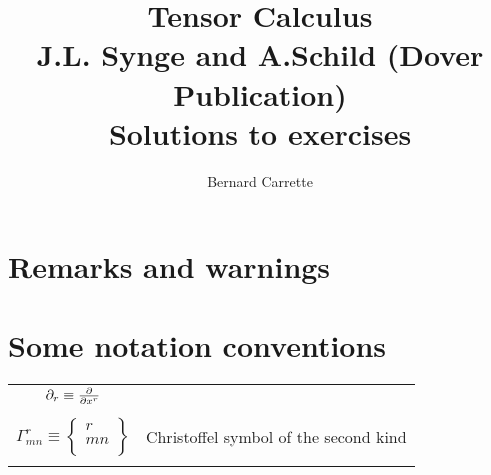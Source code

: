 \documentclass{ut-thesis}
\author{Bernard Carrette}
\title{Tensor Calculus\\J.L. Synge and A.Schild (Dover Publication)\\ Solutions to exercises}
\begin{document}
\maketitle

\section*{Remarks and warnings}
\section*{Some notation conventions}
\begin{center}
\begin{tabular}{ c c  }
$\partial_r \equiv \pdv{}{x^r}$ & \\\\
$\Gamma^r_{mn} \equiv 
\begin{Bmatrix}
r\\
m n\\
\end{Bmatrix}$ & Christoffel symbol of the second kind\\\\

\end{tabular}
\end{center}

\tableofcontents



%
%
%
\end{document}
